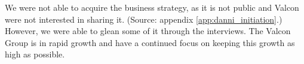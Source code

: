 We were not able to acquire the business strategy, as it is not public and Valcon were not interested in sharing it. (Source: appendix \ref{app:danni_initiation}.)
However, we were able to glean some of it through the interviews.
The Valcon Group is in rapid growth and have a continued focus on keeping this growth as high as possible.


